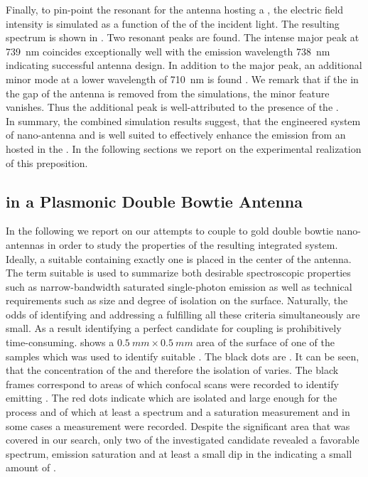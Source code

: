 		Finally, to pin-point the resonant \wl for the antenna hosting a \nd, the electric field intensity is simulated as a function of the \wl of the incident light. The resulting spectrum is shown in . Two resonant peaks are found. The intense major peak at \SI{739}{nm} coincides exceptionally well with the \siv emission wavelength \SI{738}{nm} indicating successful antenna design. In addition to the major peak, an additional minor mode at a lower wavelength of \SI{710}{nm} is found \cite{Rahbany2016}. We remark that if the \nd in the gap of the antenna is removed from the simulations, the minor feature vanishes. Thus the additional peak is well-attributed to the presence of the \nd.
		\\
		In summary, the combined simulation results suggest, that the engineered system of nano-antenna and \nd is well suited to effectively enhance the emission from an \siv hosted in the \nd. In the following sections we report on the experimental realization of this preposition.

	\subsection{\siv in a Plasmonic Double Bowtie Antenna}

		In the following we report on our attempts to couple \sivs to gold double bowtie nano-antennas in order to study the properties of the resulting integrated system. Ideally, a suitable \nd containing exactly one \siv is placed in the center of the antenna. The term suitable is used to summarize both desirable spectroscopic properties such as narrow-bandwidth saturated single-photon emission as well as technical requirements such as \nd size and degree of isolation on the surface. Naturally, the odds of identifying and addressing a \nd fulfilling all these criteria simultaneously are small.
		As a result identifying a perfect candidate for coupling is prohibitively time-consuming.
		 shows a $\SI{0.5}{mm}\times\SI{0.5}{mm}$ area of the surface of one of the samples which was used to identify suitable \nds.
		The black dots are \nds.
		It can be seen, that the concentration of the \nds and therefore the isolation of \nds varies.
		The black frames correspond to areas of which confocal scans were recorded to identify \nds emitting \fl.
		The red dots indicate \nds which are isolated and large enough for the \pp process and of which at least a \pl spectrum and a saturation measurement and in some cases a \gt measurement were recorded.
		Despite the significant area that was covered in our search, only two of the investigated candidate \nds revealed a favorable spectrum, emission saturation and at least a small dip in the \gtf indicating a small amount of \sivs. 

